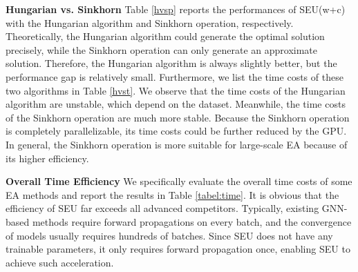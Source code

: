 \documentclass[11pt]{article}
\begin{document}
\textbf{Hungarian vs. Sinkhorn}
Table \ref{hvsp} reports the performances of SEU(w+c) with the Hungarian algorithm and Sinkhorn operation, respectively.
Theoretically, the Hungarian algorithm could generate the optimal solution precisely, while the Sinkhorn operation can only generate an approximate solution.
Therefore, the Hungarian algorithm is always slightly better, but the performance gap is relatively small.
Furthermore, we list the time costs of these two algorithms in Table \ref{hvst}.
We observe that the time costs of the Hungarian algorithm are unstable, which depend on the dataset.
Meanwhile, the time costs of the Sinkhorn operation are much more stable.
Because the Sinkhorn operation is completely parallelizable, its time costs could be further reduced by the GPU.
In general, the Sinkhorn operation is more suitable for large-scale EA because of its higher efficiency.

\begin{table}[t]
\begin{center}
\end{center}
\caption{Time costs of EA methods (seconds).\protect\footnotemark}\label{tabel:time}
\vspace{-1em}
\end{table}

\textbf{Overall Time Efficiency}
We specifically evaluate the overall time costs of some EA methods and report the results in Table \ref{tabel:time}.
It is obvious that the efficiency of SEU far exceeds all advanced competitors.
Typically, existing GNN-based methods require forward propagations on every batch, and the convergence of models usually requires hundreds of batches.
Since SEU does not have any trainable parameters, it only requires forward propagation once, enabling SEU to achieve such acceleration.
\end{document}
